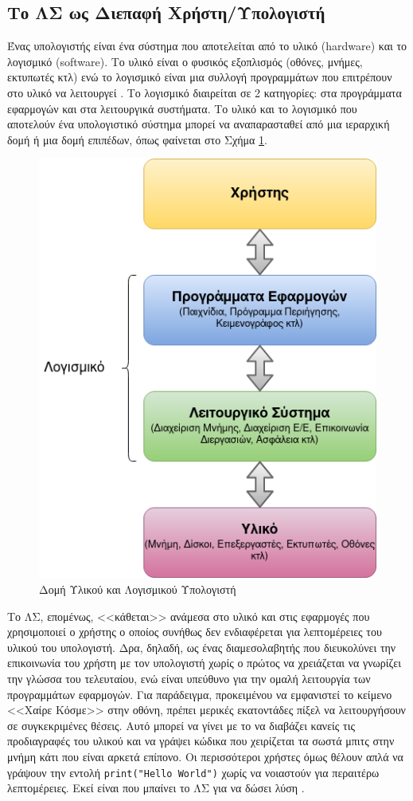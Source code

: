 \subsection{Το ΛΣ ως Διεπαφή Χρήστη/Υπολογιστή}
Ένας υπολογιστής είναι ένα σύστημα που αποτελείται από το υλικό (hardware) και το λογισμικό (software). Το υλικό είναι ο φυσικός εξοπλισμός (οθόνες, μνήμες, εκτυπωτές κτλ) ενώ το λογισμικό είναι μια συλλογή προγραμμάτων που επιτρέπουν στο υλικό να λειτουργεί \cite{forouzan}. Το λογισμικό διαιρείται σε 2 κατηγορίες: στα προγράμματα εφαρμογών και στα λειτουργικά συστήματα. Το υλικό και το λογισμικό που αποτελούν ένα υπολογιστικό σύστημα μπορεί να αναπαρασταθεί από μια ιεραρχική δομή ή μια δομή επιπέδων, όπως φαίνεται στο Σχήμα \ref{fig:os_hierarchy}.
\begin{figure}[t]
	\centering
	\includegraphics[scale=0.6]{./images/chapter2/OS_hierarchy.png}
	\caption{Δομή Υλικού και Λογισμικού Υπολογιστή}
	\label{fig:os_hierarchy}
\end{figure}

Το ΛΣ, επομένως, <<κάθεται>> ανάμεσα στο υλικό και στις εφαρμογές που χρησιμοποιεί ο χρήστης ο οποίος συνήθως δεν ενδιαφέρεται για λεπτομέρειες του υλικού του υπολογιστή. Δρα, δηλαδή, ως ένας διαμεσολαβητής που διευκολύνει την επικοινωνία του χρήστη με τον υπολογιστή χωρίς ο πρώτος να χρειάζεται να γνωρίζει την γλώσσα του τελευταίου, ενώ είναι υπεύθυνο για την ομαλή λειτουργία των προγραμμάτων εφαρμογών. Για παράδειγμα, προκειμένου να εμφανιστεί το κείμενο <<Χαίρε Κόσμε>> στην οθόνη, πρέπει μερικές εκατοντάδες πίξελ να λειτουργήσουν σε συγκεκριμένες θέσεις. Αυτό μπορεί να γίνει με το να διαβάζει κανείς τις προδιαγραφές του υλικού και να γράψει κώδικα που χειρίζεται τα σωστά μπιτς στην μνήμη κάτι που είναι αρκετά επίπονο. Οι περισσότεροι χρήστες όμως θέλουν απλά να γράψουν την εντολή \texttt{print("Hello World")} χωρίς να νοιαστούν για περαιτέρω λεπτομέρειες. Εκεί είναι που μπαίνει το ΛΣ για να δώσει λύση \cite{elements_of_computing}.

